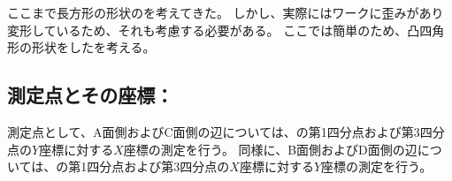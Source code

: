 \clearpage
ここまで長方形の形状の\EndFaceCChamferMilling を考えてきた。
しかし、実際にはワークに歪みがあり変形しているため、それも考慮する必要がある。
ここでは簡単のため、凸四角形の形状をした\EndFaceCChamferMilling を考える。


\subsection{測定点とその座標：\EndFaceOutChamfer}
測定点として、A面側およびC面側の辺については、\BDOD の第1四分点および第3四分点の$Y$座標に対する$X$座標の測定を行う。
同様に、B面側およびD面側の辺については、\ACOD の第1四分点および第3四分点の$X$座標に対する$Y$座標の測定を行う。

